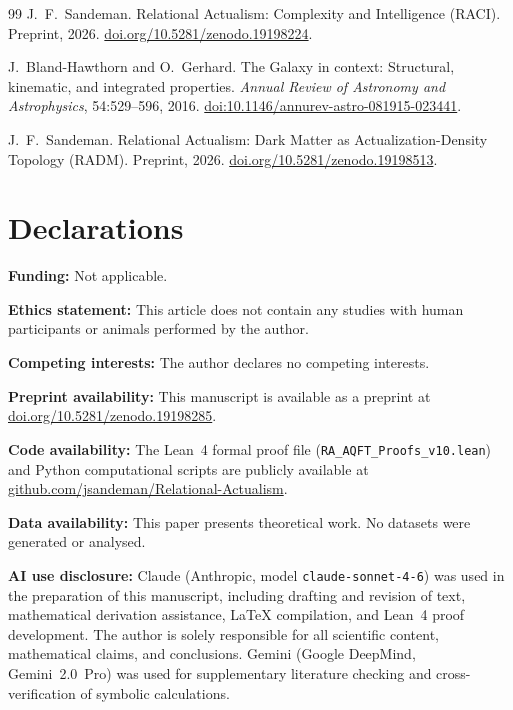 \documentclass[11pt,a4paper]{article}
\theoremstyle{plain}
\theoremstyle{definition}
\theoremstyle{remark}
\begin{document}
\begin{thebibliography}{99}
J.~F.~Sandeman.
\newblock Relational Actualism: Complexity and Intelligence ({RACI}).
\newblock Preprint, 2026.
\newblock \href{https://doi.org/10.5281/zenodo.19198224}{doi.org/10.5281/zenodo.19198224}.

J.~Bland-Hawthorn and O.~Gerhard.
\newblock The Galaxy in context: Structural, kinematic, and integrated
  properties.
\newblock \emph{Annual Review of Astronomy and Astrophysics}, 54:529--596, 2016.
\newblock \href{https://doi.org/10.1146/annurev-astro-081915-023441}{doi:10.1146/annurev-astro-081915-023441}.

J.~F.~Sandeman.
\newblock Relational Actualism: Dark Matter as Actualization-Density Topology ({RADM}).
\newblock Preprint, 2026.
\newblock \href{https://doi.org/10.5281/zenodo.19198513}{doi.org/10.5281/zenodo.19198513}.

\end{thebibliography}

\section*{Declarations}
\textbf{Funding:} Not applicable.

\textbf{Ethics statement:} This article does not contain any studies with human participants or animals performed by the author.

\quad
\textbf{Competing interests:} The author declares no competing interests.

\textbf{Preprint availability:} This manuscript is available as a preprint at
\href{https://doi.org/10.5281/zenodo.19198285}{doi.org/10.5281/zenodo.19198285}.

\textbf{Code availability:} The Lean~4 formal proof file (\texttt{RA\_AQFT\_Proofs\_v10.lean}) and Python computational scripts are publicly available at \href{https://github.com/jsandeman/Relational-Actualism}{github.com/jsandeman/Relational-Actualism}.

\textbf{Data availability:} This paper presents theoretical work. No datasets
were generated or analysed.

\textbf{AI use disclosure:} Claude (Anthropic, model \texttt{claude-sonnet-4-6}) was used in the preparation of this manuscript, including drafting and revision of text, mathematical derivation assistance, \LaTeX{} compilation, and Lean~4 proof development. The author is solely responsible for all scientific content, mathematical claims, and conclusions. Gemini (Google DeepMind, Gemini~2.0~Pro) was used for supplementary literature checking and cross-verification of symbolic calculations.
\end{document}
